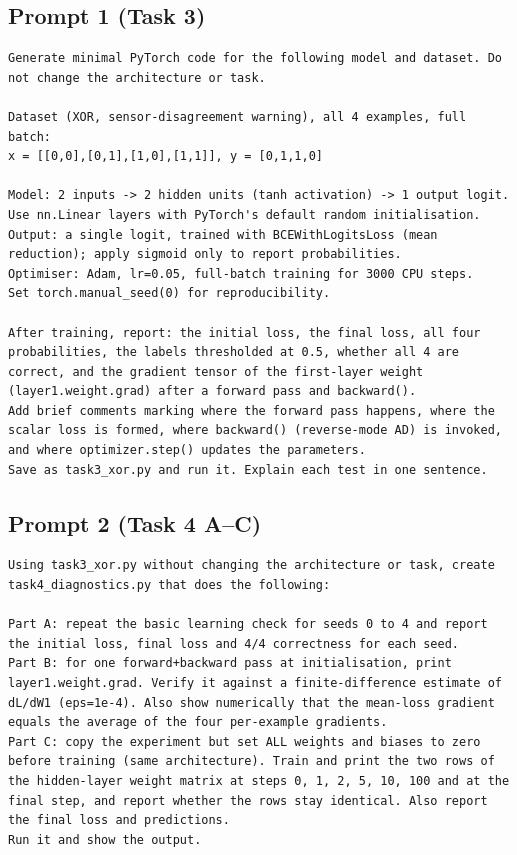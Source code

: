 \documentclass[10pt,a4paper]{article}
\begin{document}
\subsection*{Prompt 1 (Task 3)}
\begin{Verbatim}
Generate minimal PyTorch code for the following model and dataset. Do not change the architecture or task.

Dataset (XOR, sensor-disagreement warning), all 4 examples, full batch:
x = [[0,0],[0,1],[1,0],[1,1]], y = [0,1,1,0]

Model: 2 inputs -> 2 hidden units (tanh activation) -> 1 output logit.
Use nn.Linear layers with PyTorch's default random initialisation.
Output: a single logit, trained with BCEWithLogitsLoss (mean reduction); apply sigmoid only to report probabilities.
Optimiser: Adam, lr=0.05, full-batch training for 3000 CPU steps.
Set torch.manual_seed(0) for reproducibility.

After training, report: the initial loss, the final loss, all four probabilities, the labels thresholded at 0.5, whether all 4 are correct, and the gradient tensor of the first-layer weight (layer1.weight.grad) after a forward pass and backward().
Add brief comments marking where the forward pass happens, where the scalar loss is formed, where backward() (reverse-mode AD) is invoked, and where optimizer.step() updates the parameters.
Save as task3_xor.py and run it. Explain each test in one sentence.
\end{Verbatim}
\subsection*{Prompt 2 (Task 4 A--C)}
\begin{Verbatim}
Using task3_xor.py without changing the architecture or task, create task4_diagnostics.py that does the following:

Part A: repeat the basic learning check for seeds 0 to 4 and report the initial loss, final loss and 4/4 correctness for each seed.
Part B: for one forward+backward pass at initialisation, print layer1.weight.grad. Verify it against a finite-difference estimate of dL/dW1 (eps=1e-4). Also show numerically that the mean-loss gradient equals the average of the four per-example gradients.
Part C: copy the experiment but set ALL weights and biases to zero before training (same architecture). Train and print the two rows of the hidden-layer weight matrix at steps 0, 1, 2, 5, 10, 100 and at the final step, and report whether the rows stay identical. Also report the final loss and predictions.
Run it and show the output.
\end{Verbatim}
\end{document}
